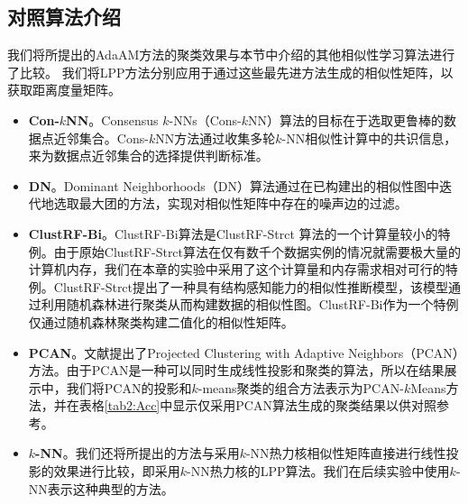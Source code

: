 \subsection{对照算法介绍}
我们将所提出的AdaAM方法的聚类效果与本节中介绍的其他相似性学习算法进行了比较。 我们将LPP方法分别应用于通过这些最先进方法生成的相似性矩阵，以获取距离度量矩阵。

\begin{itemize}
	\item \textbf{Con-$k$NN}。Consensus $k$-NNs（Cons-$k$NN）算法\cite{premachandran2013consensus}的目标在于选取更鲁棒的数据点近邻集合。Cons-$k$NN方法通过收集多轮$k$-NN相似性计算中的共识信息，来为数据点近邻集合的选择提供判断标准。
	\item \textbf{DN}。Dominant Neighborhoods（DN）算法\cite{pavan2007dominant}通过在已构建出的相似性图中迭代地选取最大团的方法，实现对相似性矩阵中存在的噪声边的过滤。
	\item \textbf{ClustRF-Bi}。ClustRF-Bi算法\cite{criminisi2012decision,pei2013unsupervised}是ClustRF-Strct \cite{zhu2014constructing}算法的一个计算量较小的特例。由于原始ClustRF-Strct算法在仅有数千个数据实例的情况就需要极大量的计算机内存，我们在本章的实验中采用了这个计算量和内存需求相对可行的特例。ClustRF-Strct提出了一种具有结构感知能力的相似性推断模型，该模型通过利用随机森林进行聚类从而构建数据的相似性图。ClustRF-Bi作为一个特例仅通过随机森林聚类构建二值化的相似性矩阵。
	\item \textbf{PCAN}。文献\parencite{nie2014clustering}提出了Projected Clustering with Adaptive Neighbors（PCAN）方法。由于PCAN是一种可以同时生成线性投影和聚类的算法，所以在结果展示中，我们将PCAN的投影和$k$-means聚类的组合方法表示为PCAN-$k$Means方法，并在表格\ref{tab2:Acc}中显示仅采用PCAN算法生成的聚类结果以供对照参考。
	\item \textbf{$k$-NN}。我们还将所提出的方法与采用$k$-NN热力核相似性矩阵直接进行线性投影的效果进行比较，即采用$k$-NN热力核的LPP算法。我们在后续实验中使用$k$-NN表示这种典型的方法。
\end{itemize}

